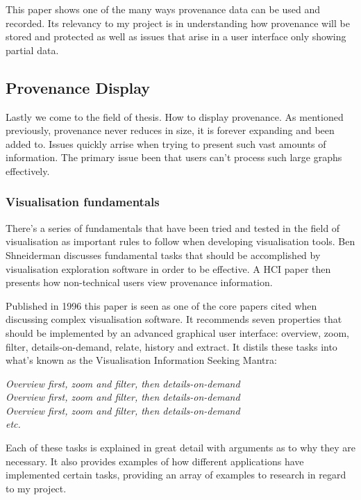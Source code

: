 This paper shows one of the many ways provenance data can be used and recorded. Its relevancy to my project is in understanding how provenance will be stored and protected as well as issues that arise in a user interface only showing partial data.

\subsection{Provenance Display}
\label{sec:provenance_display}

Lastly we come to the field of thesis. How to display provenance. As mentioned previously, provenance never reduces in size, it is forever expanding and been added to. Issues quickly arrise when trying to present such vast amounts of information. The primary issue been that users can't process such large graphs effectively.

\subsubsection{Visualisation fundamentals}
\label{sub:visualisation_fundamentals}

There's a series of fundamentals that have been tried and tested in the field of visualisation as important rules to follow when developing visualisation tools. Ben Shneiderman discusses fundamental tasks that should be accomplished by visualisation exploration software in order to be effective. A HCI paper then presents how non-technical users view provenance information.

Published in 1996 this paper is seen as one of the core papers cited when discussing complex visualisation software. It recommends seven properties that should be implemented by an advanced graphical user interface: overview, zoom, filter, details-on-demand, relate, history and extract. It distils these tasks into what's known as the Visualisation Information Seeking Mantra:

\textit{Overview first, zoom and filter, then details-on-demand}\\
\textit{Overview first, zoom and filter, then details-on-demand}\\
\textit{Overview first, zoom and filter, then details-on-demand}\\
\textit{etc.}

Each of these tasks is explained in great detail with arguments as to why they are necessary. It also provides examples of how different applications have implemented certain tasks, providing an array of examples to research in regard to my project.

